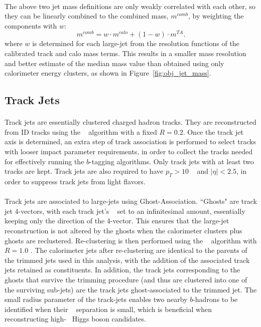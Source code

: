 \paragraph{}
The above two jet mass definitions are only weakly correlated with each other, so they can be linearly combined to the combined mass, $m^{comb}$, by weighting the components with $w$:
\begin{equation}
m^{comb} = w\cdot m^{calo}+(1-w)\cdot m^{TA}.
\end{equation}
where $w$ is determined for each large-\R jet from the resolution functions of the calibrated track and calo mass terms.
This results in a smaller mass resolution and better estimate of the median mass value than obtained using only calorimeter energy clusters, as shown in Figure~\ref{fig:obj_jet_mass}.

\subsection{Track Jets}
\label{obj:trackjet}
\paragraph{}
Track jets are essentially clustered charged hadron tracks. 
They are reconstructed from ID tracks using the \akt~ algorithm with a fixed $R=0.2$. 
Once the track jet axis is determined, an extra step of track association is performed to select tracks with looser impact parameter requirements, in order to collect the tracks needed for effectively running the $b$-tagging algorithms.
Only track jets with at least two tracks are kept.
Track jets are also required to have $p_T > 10$ \GeV~ and $|\eta| < 2.5$, in order to suppress track jets from light flavors.

\paragraph{}
Track jets are associated to large-\R jets using Ghost-Association.
``Ghosts" are track jet 4-vectors, with each track jet's \pt~ set to an infinitesimal amount, essentially keeping only the direction of the 4-vector.
This ensures that the large-\R jet reconstruction is not altered by the ghosts when the calorimeter clusters plus ghosts are reclustered.
Re-clustering is then performed using the \akt~ algorithm with $R=1.0$ .
The calorimeter jets after re-clustering are identical to the parents of the trimmed jets used in this analysis, with the addition of the associated track jets retained as constituents.
In addition, the track jets corresponding to the ghosts that survive the trimming procedure (and thus are clustered into one of the surviving sub-jets) are the track jets ghost-associated to the trimmed jet.
The small radius parameter of the track-jets enables two nearby $b$-hadrons to be identified when their \DR~ separation is small, which is beneficial when reconstructing high-\pt~ Higgs boson candidates.

